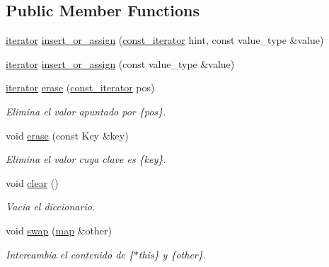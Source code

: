 \subsection*{\-Public \-Member \-Functions}
\begin{DoxyCompactItemize}
\item 
\hyperlink{classaed2_1_1map_1_1iterator}{iterator} \hyperlink{classaed2_1_1map_a2ef6723c183916276b0afc4a4c721475}{insert\-\_\-or\-\_\-assign} (\hyperlink{classaed2_1_1map_1_1const__iterator}{const\-\_\-iterator} hint, const value\-\_\-type \&value)
\item 
\hyperlink{classaed2_1_1map_1_1iterator}{iterator} \hyperlink{classaed2_1_1map_a9128a806713bcc999ebd8a97ab77e765}{insert\-\_\-or\-\_\-assign} (const value\-\_\-type \&value)
\item 
\hyperlink{classaed2_1_1map_1_1iterator}{iterator} \hyperlink{classaed2_1_1map_ad8e796bf9c9c558e5ce6b61e116253fe}{erase} (\hyperlink{classaed2_1_1map_1_1const__iterator}{const\-\_\-iterator} pos)
\begin{DoxyCompactList}\small\item\em \-Elimina el valor apuntado por \{pos\}. \end{DoxyCompactList}\item 
void \hyperlink{classaed2_1_1map_a2ffadb42cd5f0bc7b3752ff159b75334}{erase} (const \-Key \&key)
\begin{DoxyCompactList}\small\item\em \-Elimina el valor cuya clave es \{key\}. \end{DoxyCompactList}\item 
void \hyperlink{classaed2_1_1map_a2bfa5165825979bf2431db55bc6bc9ca}{clear} ()
\begin{DoxyCompactList}\small\item\em \-Vacia el diccionario. \end{DoxyCompactList}\item 
void \hyperlink{classaed2_1_1map_a43ddb71cc91e5c6021a7a1f243d6cc4a}{swap} (\hyperlink{classaed2_1_1map}{map} \&other)
\begin{DoxyCompactList}\small\item\em \-Intercambia el contenido de \{$\ast$this\} y \{other\}. \end{DoxyCompactList}\end{DoxyCompactItemize}
